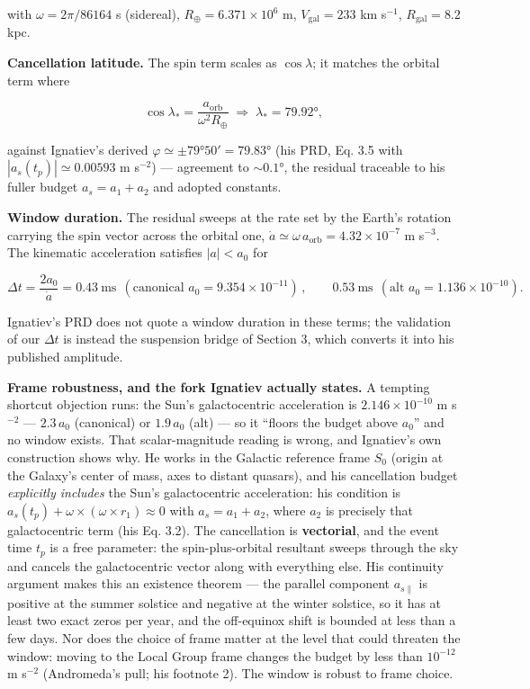 \documentclass[
]{article}
\begin{document}
with \(\omega = 2\pi/86164\) s (sidereal),
\(R_\oplus = 6.371\times10^6\) m, \(V_\mathrm{gal} = 233\) km s\(^{-1}\),
\(R_\mathrm{gal} = 8.2\) kpc.

\textbf{Cancellation latitude.} The spin term scales as \(\cos\lambda\);
it matches the orbital term where

\[\cos\lambda_\ast = \frac{a_\mathrm{orb}}{\omega^2 R_\oplus} \;\Rightarrow\; \lambda_\ast = 79.92°,\]

against Ignatiev's derived \(\varphi \simeq \pm79°50' = 79.83°\) (his
PRD, Eq. 3.5 with \(|a_s(t_p)| \simeq 0.00593\) m s\(^{-2}\)) ---
agreement to \(\sim0.1°\), the residual traceable to his fuller budget
\(a_s = a_1 + a_2\) and adopted constants.

\textbf{Window duration.} The residual sweeps at the rate set by the
Earth's rotation carrying the spin vector across the orbital one,
\(\dot a \simeq \omega\, a_\mathrm{orb} = 4.32\times10^{-7}\) m s\(^{-3}\).
The kinematic acceleration satisfies \(|a| < a_0\) for

\[\Delta t = \frac{2a_0}{\dot a} = 0.43\ \mathrm{ms}\ \ (\text{canonical } a_0 = 9.354\times10^{-11})\,, \qquad 0.53\ \mathrm{ms}\ \ (\text{alt } a_0 = 1.136\times10^{-10}).\]

Ignatiev's PRD does not quote a window duration in these terms; the
validation of our \(\Delta t\) is instead the suspension bridge of
Section 3, which converts it into his published amplitude.

\textbf{Frame robustness, and the fork Ignatiev actually states.} A
tempting shortcut objection runs: the Sun's galactocentric acceleration
is \(2.146\times10^{-10}\) m s\(^{-2}\) --- \(2.3\,a_0\) (canonical) or
\(1.9\,a_0\) (alt) --- so it ``floors the budget above \(a_0\)'' and no
window exists. That scalar-magnitude reading is wrong, and Ignatiev's
own construction shows why. He works in the Galactic reference frame
\(S_0\) (origin at the Galaxy's center of mass, axes to distant
quasars), and his cancellation budget \emph{explicitly includes} the
Sun's galactocentric acceleration: his condition is
\(a_s(t_p) + \omega\times(\omega\times r_1) \approx 0\) with
\(a_s = a_1 + a_2\), where \(a_2\) is precisely that galactocentric term
(his Eq. 3.2). The cancellation is \textbf{vectorial}, and the event
time \(t_p\) is a free parameter: the spin-plus-orbital resultant sweeps
through the sky and cancels the galactocentric vector along with
everything else. His continuity argument makes this an existence theorem
--- the parallel component \(a_{s\parallel}\) is positive at the summer
solstice and negative at the winter solstice, so it has at least two
exact zeros per year, and the off-equinox shift is bounded at less than
a few days. Nor does the choice of frame matter at the level that could
threaten the window: moving to the Local Group frame changes the budget
by less than \(10^{-12}\) m s\(^{-2}\) (Andromeda's pull; his footnote
2). The window is robust to frame choice.
\end{document}
